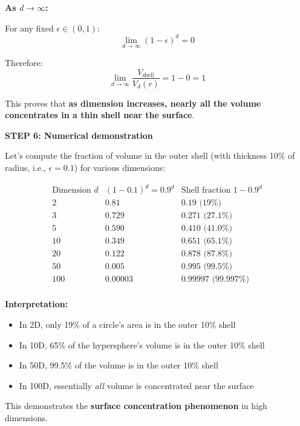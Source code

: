 \documentclass[12pt]{article}
\begin{document}
\begin{solution}
\textbf{As \(d \to \infty\):}

For any fixed \(\epsilon \in (0, 1)\):
\[
\lim_{d \to \infty} (1-\epsilon)^d = 0
\]

Therefore:
\[
\lim_{d \to \infty} \frac{V_{\text{shell}}}{V_d(r)} = 1 - 0 = 1
\]

This proves that \textbf{as dimension increases, nearly all the volume concentrates in a thin shell near the surface}.

\textbf{STEP 6: Numerical demonstration}

Let's compute the fraction of volume in the outer shell (with thickness 10\% of radius, i.e., \(\epsilon = 0.1\)) for various dimensions:

\[
\begin{array}{c|c|c}
\text{Dimension } d & (1-0.1)^d = 0.9^d & \text{Shell fraction } 1 - 0.9^d \\
\hline
2 & 0.81 & 0.19 \text{ (19\%)} \\
3 & 0.729 & 0.271 \text{ (27.1\%)} \\
5 & 0.590 & 0.410 \text{ (41.0\%)} \\
10 & 0.349 & 0.651 \text{ (65.1\%)} \\
20 & 0.122 & 0.878 \text{ (87.8\%)} \\
50 & 0.005 & 0.995 \text{ (99.5\%)} \\
100 & 0.00003 & 0.99997 \text{ (99.997\%)} \\
\end{array}
\]

\textbf{Interpretation:}
\begin{itemize}
    \item In 2D, only 19\% of a circle's area is in the outer 10\% shell
    \item In 10D, 65\% of the hypersphere's volume is in the outer 10\% shell
    \item In 50D, 99.5\% of the volume is in the outer 10\% shell
    \item In 100D, essentially \textit{all} volume is concentrated near the surface
\end{itemize}

This demonstrates the \textbf{surface concentration phenomenon} in high dimensions.
\end{solution}
\end{document}
